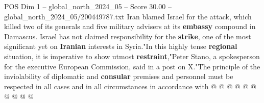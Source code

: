 \begin{textsample}{POS Dim 1 – global\_north\_2024\_05 – Score 30.00 – global\_north\_2024\_05/200449787.txt}
Iran blamed Israel for the attack, which killed two of its generals and five military advisers at its \textbf{embassy} compound in Damascus.
Israel has not claimed responsibility for the \textbf{strike}, one of the most significant yet on \textbf{Iranian} interests in Syria."In this highly tense \textbf{regional} situation, it is imperative to show utmost \textbf{restraint},"Peter Stano, a spokesperson for the executive European Commission, said in a post on X."The principle of the inviolability of diplomatic and \textbf{consular} premises and personnel must be respected in all cases and in all circumstances in accordance with @ @ @ @ @ @ @ @ @ @

\end{textsample}
